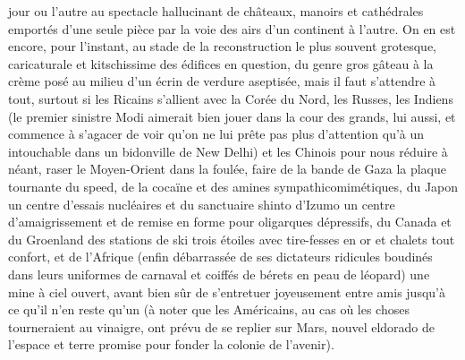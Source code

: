 jour ou l’autre au spectacle hallucinant de châteaux, manoirs et cathédrales emportés d’une seule pièce par la voie des airs d’un continent à l’autre. On en est encore, pour l’instant, au stade de la reconstruction le plus souvent grotesque, caricaturale et kitschissime des édifices en question, du genre gros gâteau à la crème posé au milieu d’un écrin de verdure aseptisée, mais il faut s’attendre à tout, surtout si les Ricains s’allient avec la Corée du Nord, les Russes, les Indiens (le premier sinistre Modi aimerait bien jouer dans la cour des grands, lui aussi, et commence à s’agacer de voir qu’on ne lui prête pas plus d’attention qu’à un intouchable dans un bidonville de New Delhi) et les Chinois pour nous réduire à néant, raser le Moyen-Orient dans la foulée, faire de la bande de Gaza la plaque tournante du speed, de la cocaïne et des amines sympathicomimétiques, du Japon un centre d’essais nucléaires et du sanctuaire shinto d’Izumo un centre d’amaigrissement et de remise en forme pour oligarques dépressifs, du Canada et du Groenland des stations de ski trois étoiles avec tire-fesses en or et chalets tout confort, et de l’Afrique (enfin débarrassée de ses dictateurs ridicules boudinés dans leurs uniformes de carnaval et coiffés de bérets en peau de léopard) une mine à ciel ouvert, avant bien sûr de s’entretuer joyeusement entre amis jusqu’à ce qu’il n’en reste qu’un (à noter que les Américains, au cas où les choses tourneraient au vinaigre, ont prévu de se replier sur Mars, nouvel eldorado de l’espace et terre promise pour fonder la colonie de l’avenir).\par

%
%

%
